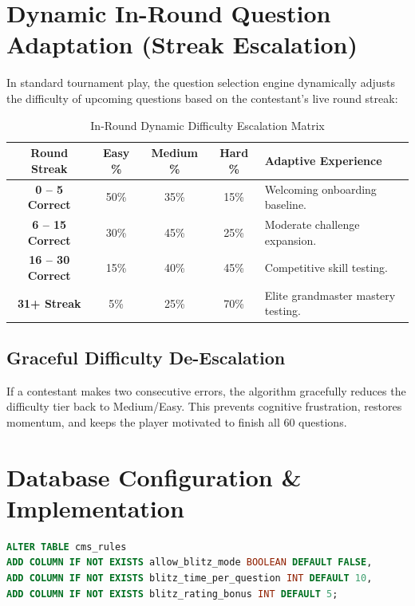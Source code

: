 \section{Dynamic In-Round Question Adaptation (Streak Escalation)}
In standard tournament play, the question selection engine dynamically adjusts the difficulty of upcoming questions based on the contestant's live round streak:

\begin{table}[htbp]
\centering
\footnotesize
\begin{tabular}{|c|c|c|c|p{4.2cm}|}
\hline
\rowcolor{primaryBlue!15}
\textbf{Round Streak} & \textbf{Easy \%} & \textbf{Medium \%} & \textbf{Hard \%} & \textbf{Adaptive Experience} \\ \hline
\textbf{0 -- 5 Correct} & 50\% & 35\% & 15\% & Welcoming onboarding baseline. \\ \hline
\textbf{6 -- 15 Correct} & 30\% & 45\% & 25\% & Moderate challenge expansion. \\ \hline
\textbf{16 -- 30 Correct} & 15\% & 40\% & 45\% & Competitive skill testing. \\ \hline
\textbf{31+ Streak} & 5\% & 25\% & 70\% & Elite grandmaster mastery testing. \\ \hline
\end{tabular}
\caption{In-Round Dynamic Difficulty Escalation Matrix}
\end{table}

\subsection{Graceful Difficulty De-Escalation}
If a contestant makes two consecutive errors, the algorithm gracefully reduces the difficulty tier back to Medium/Easy. This prevents cognitive frustration, restores momentum, and keeps the player motivated to finish all 60 questions.

\section{Database Configuration \& Implementation}

\begin{lstlisting}[language=SQL, caption={PostgreSQL Rules Schema Extension for Blitz Mode}]
ALTER TABLE cms_rules 
ADD COLUMN IF NOT EXISTS allow_blitz_mode BOOLEAN DEFAULT FALSE,
ADD COLUMN IF NOT EXISTS blitz_time_per_question INT DEFAULT 10,
ADD COLUMN IF NOT EXISTS blitz_rating_bonus INT DEFAULT 5;
\end{lstlisting}

